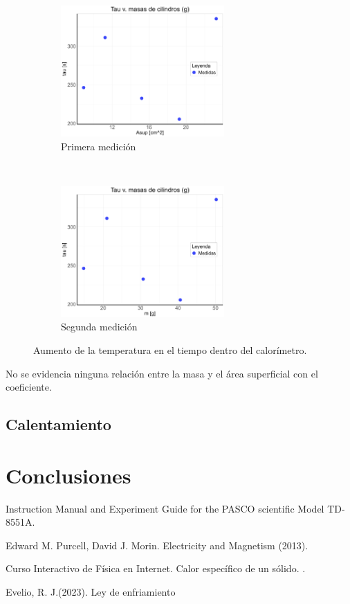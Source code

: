 \documentclass{article}
\begin{document}
\begin{figure}[H]
    \centering
    \begin{subfigure}[t]{0.5\textwidth}
        \centering
        \includegraphics[height=5cm]{media/TauvAsup.png}
        \caption{Primera medición}
    \end{subfigure}%
    ~ 
    \begin{subfigure}[t]{0.5\textwidth}
        \centering
        \includegraphics[height=5cm]{media/TauvM.png}
        \caption{Segunda medición}
    \end{subfigure}
    \caption{Aumento de la temperatura en el tiempo dentro del calorímetro.}
    \label{fig:electemp}
\end{figure}

No se evidencia ninguna relación entre la masa y el área superficial con el coeficiente.


\subsection{Calentamiento}


\section{Conclusiones}


\begin{thebibliography}{X}

 Instruction Manual and Experiment Guide for the PASCO scientific Model TD-8551A. 

 Edward M. Purcell, David J. Morin. Electricity and Magnetism (2013).

 Curso Interactivo de Física en Internet. Calor específico de un sólido. . 

 Evelio, R. J.(2023). Ley de enfriamiento

\end{thebibliography}
\end{document}

